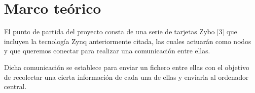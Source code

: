 \section{Marco teórico}
El punto de partida del proyecto consta de una serie de tarjetas Zybo \hyperlink{3}{[3]} que incluyen la tecnología Zynq anteriormente citada, las cuales actuarán como nodos y que queremos conectar para realizar una comunicación entre ellas.

Dicha comunicación se establece para enviar un fichero entre ellas con el objetivo de recolectar una cierta información de cada una de ellas y enviarla al ordenador central.

